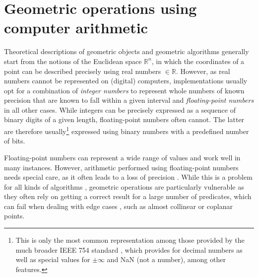 \section{Geometric operations using computer arithmetic}
\label{se:computerarithmetic}

Theoretical descriptions of geometric objects and geometric algorithms generally start from the notions of the Euclidean space $\mathbb{R}^n$, in which the coordinates of a point can be described precisely using real numbers $\in \mathbb{R}$.
However, as real numbers cannot be represented on (digital) computers, implementations usually opt for a combination of \emph{integer numbers} to represent whole numbers of known precision that are known to fall within a given interval and \emph{floating-point numbers} in all other cases.
While integers can be precisely expressed as a sequence of binary digits of a given length, floating-point numbers often cannot.
The latter are therefore usually\footnote{This is only the most common representation among those provided by the much broader IEEE 754 standard \citep{IEEE754-2008}, which provides for decimal numbers as well as special values for $\pm \infty$ and NaN (not a number), among other features.} expressed using binary numbers with a predefined number of bits.



Floating-point numbers can represent a wide range of values and work well in many instances.
However, arithmetic performed using floating-point numbers needs special care, as it often leads to a loss of precision \citep{Goldberg91}.
While this is a problem for all kinds of algorithms \citep{Hoffmann88}, geometric operations are particularly vulnerable as they often rely on getting a correct result for a large number of predicates, which can fail when dealing with edge cases \citep{Kettner08}, such as almost collinear or coplanar points.

